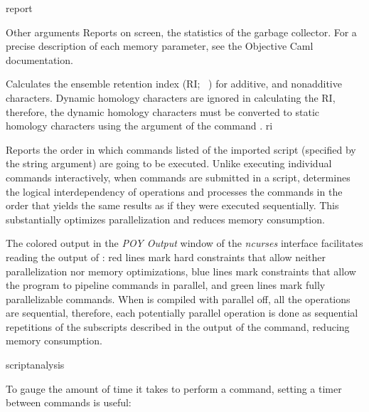 \begin{command}{report}{}
\begin{arguments}
\begin{argumentgroup}{Other arguments}
                {Reports on screen, the statistics of
                the garbage collector. For a precise description of each memory parameter, see
                the Objective Caml documentation.}
                {}
	     
	      {Calculates the ensemble retention index (RI; ~\cite{farris1989}) for additive, and
	      nonadditive characters. Dynamic homology characters are ignored in calculating
	      the RI, therefore, the dynamic homology characters must be converted
	      to static homology characters using the argument  
	      of the command .}
	      {ri}
	      
                {Reports the order in which commands listed of the imported
                script (specified by the string argument) are going to be executed.
                Unlike executing individual commands interactively, when commands are submitted in a 
                script, \poy determines the logical interdependency of operations
                and processes the commands in the order that yields the same
                results as if they were executed sequentially. This substantially
                optimizes parallelization and reduces memory consumption.
                
                The colored output in the \emph{POY Output} window of the \emph{ncurses}
                interface facilitates reading the output of :
                red lines mark hard constraints that allow neither
                parallelization nor memory optimizations, blue lines mark 
                constraints that allow the program to pipeline commands in
                parallel, and green lines mark fully parallelizable commands. When \poy
                is compiled with parallel off, all the operations are
                sequential, therefore, each potentially parallel operation is
                done as sequential repetitions of the subscripts described in
                the output of the command, reducing memory consumption.}
                {scriptanalysis}
                
           \begin{statement}
	     To gauge the amount of time it takes \poy to perform a command, 
	     setting a timer between commands is useful:
	\begin{flushleft}
	    	 \\
		 \\
		 \\
	   	 \\
	\end{flushleft}
	

\end{statement}
\end{argumentgroup}
\end{arguments}
\end{command}
